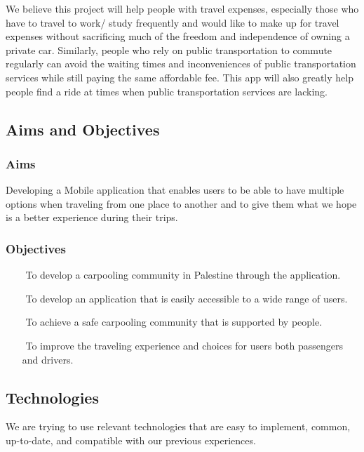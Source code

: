 \documentclass[a4paper, 12pt]{report} %
\begin{document}
            We believe this project will help people with travel expenses, especially those who have to travel to work/ study frequently and would like to make up for travel expenses without sacrificing much of the freedom and independence of owning a private car. Similarly, people who rely on public transportation to commute regularly can avoid the waiting times and inconveniences of public transportation services while still paying the same affordable fee. This app will also greatly help people find a ride at times when public transportation services are lacking. 
            
        \subsection{Aims and Objectives}
            \subsubsection{Aims}
                Developing a Mobile application that enables users to be able to have multiple options when traveling from one place to another and to give them what we hope is a better experience during their trips.
                
            \subsubsection{Objectives}
                \begin{itemize}
                    \item [$ $] To develop a carpooling community in Palestine through the application.
                     \item [$ $] To develop an application that is easily accessible to a wide range of users.
                     \item [$ $] To achieve a safe carpooling community that is supported by people.
                     \item [$ $] To improve the traveling experience and choices for users both passengers and drivers.
                \end{itemize}

        \subsection{Technologies}
            We are trying to use relevant technologies that are easy to implement, common, up-to-date, and compatible with our previous experiences.
\end{document}
